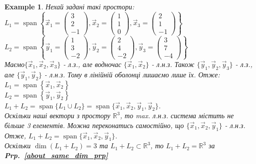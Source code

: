 \documentclass[a4paper, 10pt]{article}
\theoremstyle{theoremdd}
\newtheorem{example}[theorem]{Example}
\newcommand\prpref[1]{\textbf{Prp.~\ref{#1}}}
\DeclareMathOperator{\linspan}{span}
\begin{document}
	\begin{example}
	Нехай задані такі простори: \\ 
	$L_1 = \linspan\left\{ \vec{x}_1 = \begin{pmatrix} 3 \\ 2 \\ -1 \end{pmatrix}, \vec{x}_2 = \begin{pmatrix} 1 \\ 1 \\ 0 \end{pmatrix}, \vec{x}_3 = \begin{pmatrix} 2 \\ 1 \\ -1 \end{pmatrix}	 \right\}$\\
	$L_2 = \linspan\left\{ \vec{y}_1 = \begin{pmatrix} 1 \\ 3 \\ -2 \end{pmatrix}, \vec{y}_2 = \begin{pmatrix} 2 \\ 4 \\ -2 \end{pmatrix}, \vec{y}_3 = \begin{pmatrix} 3 \\ 7 \\ -4 \end{pmatrix}	 \right\}$\\
	Маємо$\{\vec{x}_1, \vec{x}_2, \vec{x}_3\}$ - л.з., але водночас $\{\vec{x}_1,\vec{x}_2\}$ - л.н.з. Також $\{\vec{y}_1,\vec{y}_2,\vec{y}_3\}$ - л.з., але $\{\vec{y}_1,\vec{y}_2\}$ - л.н.з. Тому в лінійній оболонці лишаємо лише їх. Отже: \\
	$L_1 = \linspan\left\{ \vec{x}_1, \vec{x}_2 \right\}$\\
	$L_2 = \linspan\left\{ \vec{y}_1, \vec{y}_2 \right\}$
	\bigskip \\
	$L_1 + L_2 = \linspan\{L_1 \cup L_2\} = \linspan\{\vec{x}_1, \vec{x}_2, \vec{y}_1, \vec{y}_2\}$.\\
	Оскільки наші вектори з простору $\mathbb{R}^3$, то max. л.н.з. система містить не більше 3 елементів. Можна переконатись самостійно, що $\{\vec{x}_1, \vec{x}_2, \vec{y}_1\}$ - л.н.з. Отже, $L_1 + L_2 = \linspan\{\vec{x}_1, \vec{x}_2, \vec{y}_1 \}$.\\
	Оскільки $\dim (L_1 + L_2) = 3$ та $L_1 + L_2 \subset \mathbb{R}^3$, то $L_1+L_2= \mathbb{R}^3$ за \prpref{about_same_dim_prp}

\end{example}
\end{document}

